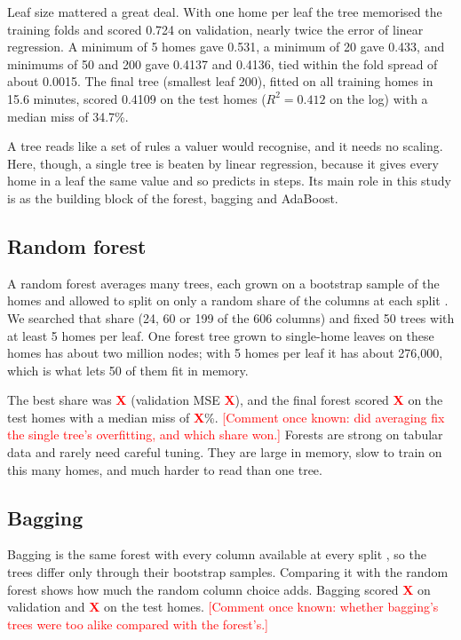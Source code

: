 \documentclass[sigconf,nonacm,10pt]{acmart}
\newcommand{\X}{\textcolor{red}{\textbf{X}}}
\newcommand{\pending}[1]{\textcolor{red}{[#1]}}
\begin{document}
Leaf size mattered a great deal. With one home per leaf the tree memorised the training folds and scored 0.724 on validation, nearly twice the error of linear regression. A minimum of 5 homes gave 0.531, a minimum of 20 gave 0.433, and minimums of 50 and 200 gave 0.4137 and 0.4136, tied within the fold spread of about 0.0015. The final tree (smallest leaf 200), fitted on all training homes in 15.6 minutes, scored 0.4109 on the test homes ($R^2 = 0.412$ on the log) with a median miss of 34.7\%.

A tree reads like a set of rules a valuer would recognise, and it needs no scaling. Here, though, a single tree is beaten by linear regression, because it gives every home in a leaf the same value and so predicts in steps. Its main role in this study is as the building block of the forest, bagging and AdaBoost.

\subsection{Random forest}
A random forest averages many trees, each grown on a bootstrap sample of the homes and allowed to split on only a random share of the columns at each split \cite{breiman2001}. We searched that share (24, 60 or 199 of the 606 columns) and fixed 50 trees with at least 5 homes per leaf. One forest tree grown to single-home leaves on these homes has about two million nodes; with 5 homes per leaf it has about 276,000, which is what lets 50 of them fit in memory.

The best share was \X{} (validation MSE \X), and the final forest scored \X{} on the test homes with a median miss of \X\%. \pending{Comment once known: did averaging fix the single tree's overfitting, and which share won.} Forests are strong on tabular data and rarely need careful tuning. They are large in memory, slow to train on this many homes, and much harder to read than one tree.

\subsection{Bagging}
Bagging is the same forest with every column available at every split \cite{breiman1996}, so the trees differ only through their bootstrap samples. Comparing it with the random forest shows how much the random column choice adds. Bagging scored \X{} on validation and \X{} on the test homes. \pending{Comment once known: whether bagging's trees were too alike compared with the forest's.}
\end{document}
